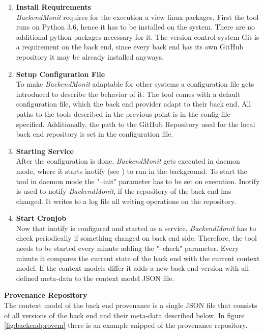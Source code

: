 \documentclass[draft,final]{vutinfth} %
\begin{document}
\begin{enumerate}
	\item \textbf{Install Requirements} \\
	\textit{BackendMonit} requires for the execution a view linux packages. First the tool runs on Python 3.6, hence it has to be installed on the system. There are no additional python packages necessary for it. The version control system Git is a requirement on the back end, since every back end has its own GitHub repository it may be already installed anyways. 
	
	\item \textbf{Setup Configuration File} \\
	To make \textit{BackendMonit} adaptable for other systems a configuration file gets introduced to describe the behavior of it. The tool comes with a default configuration file, which the back end provider adapt to their back end. All paths to the tools described in the previous point is in the config file specified. Additionally, the path to the GitHub Repository used for the local back end repository is set in the configuration file.      
	     
	\item \textbf{Starting Service} \\
	After the configuration is done, \textit{BackendMonit} gets executed in daemon mode, where it starts inotify (see \cite{inotifywait}) to run in the background. To start the tool in daemon mode the "--init" parameter has to be set on execution. Inotify is used to notify \textit{BackendMonit}, if the repository of the back end has changed. It writes to a log file all writing operations on the repository.    
	
	\item \textbf{Start Cronjob} \\
	Now that inotify is configured and started as a service, \textit{BackendMonit} has to check periodically if something changed on back end side. Therefore, the tool needs to be started every minute adding the "--check" parameter. Every minute it compares the current state of the back end with the current context model. If the context models differ it adds a new back end version with all defined meta-data to the context model JSON file. 	 
\end{enumerate}

\textbf{Provenance Repository} \\
The context model of the back end provenance is a single JSON file that consists of all versions of the back end and their meta-data described below. In figure \ref{fig:backendprovcm} there is an example snipped of the provenance repository. 
\end{document}
